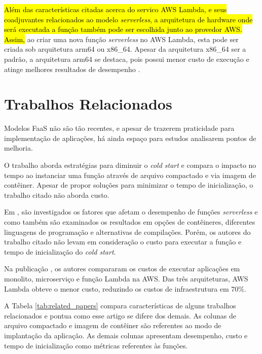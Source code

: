 \documentclass[conference]{IEEEtran}
\begin{document}

\hl{Além das características citadas acerca do servico AWS Lambda, e seus coadjuvantes relacionados ao modelo \textit{serverless}, a arquitetura de hardware onde será executada a função também pode ser escolhida junto ao provedor AWS. Assim,} ao criar uma nova função \textit{serverless} no AWS Lambda, esta pode ser criada sob arquitetura arm64 ou x86\_64. Apesar da arquitetura x86\_64 ser a padrão, a arquitetura arm64 se destaca, pois possui menor custo de execução e atinge melhores resultados de desempenho
\cite{aws_2023_aws_lambda_architectures}.

\section{Trabalhos Relacionados}
\label{sec:TrabRel}

Modelos FaaS não são tão recentes, e apesar de trazerem praticidade para implementação de aplicações, há ainda espaço para estudos analisarem pontos de melhoria.

O trabalho \cite{dantas_2022_reducing_cold_start} aborda estratégias para diminuir o \textit{cold start} e compara o impacto no tempo ao instanciar uma função através de arquivo compactado e via imagem de contêiner. Apesar de propor soluções para minimizar o tempo de inicialização, o trabalho citado não aborda custo.

Em \cite{Elsakhawy_2021_performance_analysis_serverless}, são investigados os fatores que afetam o desempenho de funções \textit{serverless} e como também são examinados os resultados em opções de contêineres, diferentes linguagens de programação e alternativas de compilações. Porém, os autores do trabalho citado não levam em consideração o custo para executar a função e tempo de inicialização do \textit{cold start}.

Na publicação \cite{Villamizar_2017_cost_comparison_lambda}, os autores compararam os custos de executar aplicações em monolito, microserviço e função Lambda na AWS. Das três arquiteturas, AWS Lambda obteve o menor custo, reduzindo os custos de infraestrutura em 70\%.

A Tabela \ref{tab:related_papers} compara características de alguns trabalhos relacionados e pontua como esse artigo se difere dos demais. As colunas de arquivo compactado e imagem de contêiner são referentes ao modo de implantação da aplicação. As demais colunas apresentam desempenho, custo e tempo de inicialização como métricas referentes às funções.
\end{document}
